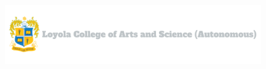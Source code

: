 


\pagestyle{empty}

\begin{figure}[H]
\vspace*{-2.5cm}
\hspace*{2.5cm}
\centering
\includegraphics[keepaspectratio, width=1.2\textwidth, right]{TemplateElements/fhLogo3.png}
\end{figure}




